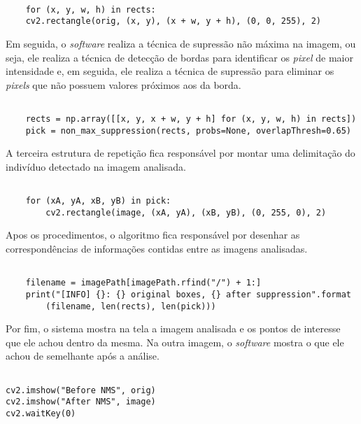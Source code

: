 \begin{verbatim}

    for (x, y, w, h) in rects:
	cv2.rectangle(orig, (x, y), (x + w, y + h), (0, 0, 255), 2)

\end{verbatim}

Em seguida, o \textit{software} realiza a técnica de supressão não máxima na imagem, ou seja, ele realiza a técnica de detecção de bordas para identificar os \textit{pixel} de maior intensidade e, em seguida, ele realiza a técnica de supressão para eliminar os \textit{pixels} que não possuem valores próximos aos da borda.

\begin{verbatim}

    rects = np.array([[x, y, x + w, y + h] for (x, y, w, h) in rects])
	pick = non_max_suppression(rects, probs=None, overlapThresh=0.65)

\end{verbatim}

A terceira estrutura de repetição fica responsável por montar uma delimitação do indivíduo detectado na imagem analisada.

\begin{verbatim}

    for (xA, yA, xB, yB) in pick:
		cv2.rectangle(image, (xA, yA), (xB, yB), (0, 255, 0), 2)

\end{verbatim}

Apos os procedimentos, o algoritmo fica responsável por desenhar as correspondências de informações contidas entre as imagens analisadas.

\begin{verbatim}

    filename = imagePath[imagePath.rfind("/") + 1:]
	print("[INFO] {}: {} original boxes, {} after suppression".format
		(filename, len(rects), len(pick)))

\end{verbatim}

Por fim, o sistema mostra na tela a imagem analisada e os pontos de interesse que ele achou dentro da mesma. Na outra imagem, o \textit{software} mostra o que ele achou de semelhante após a análise.

\begin{verbatim}

cv2.imshow("Before NMS", orig)
cv2.imshow("After NMS", image)
cv2.waitKey(0)

\end{verbatim}

